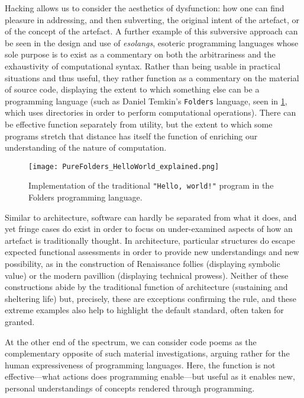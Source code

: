 Hacking allows us to consider the aesthetics of dysfunction: how one can find pleasure in addressing, and then subverting, the original intent of the artefact, or of the concept of the artefact. A further example of this subversive approach can be seen in the design and use of \emph{esolangs}, esoteric programming languages whose sole purpose is to exist as a commentary on both the arbitrariness and the exhaustivity of computational syntax. Rather than being usable in practical situations and thus useful, they rather function as a commentary on the material of source code, displaying the extent to which something else can be a programming language (such as Daniel Temkin's \lstinline{Folders} language, seen in \ref{graphic:folders}, which uses directories in order to perform computational operations). There can be effective function separately from utility, but the extent to which some programs stretch that distance has itself the function of enriching our understanding of the nature of computation.

\begin{figure}
  \texttt{[image: PureFolders\_HelloWorld\_explained.png]}
  \caption{Implementation of the traditional \lstinline{"Hello, world!"} program in the Folders programming language. \citep{temkin_daniel_2015}}
  \label{graphic:folders}
\end{figure}

Similar to architecture, software can hardly be separated from what it does, and yet fringe cases do exist in order to focus on under-examined aspects of how an artefact is traditionally thought. In architecture, particular structures do escape expected functional assessments in order to provide new understandings and new possibility, as in the construction of Renaissance follies (displaying symbolic value) or the modern pavillion (displaying technical prowess). Neither of these constructions abide by the traditional function of  architecture (sustaining and sheltering life) but, precisely, these are exceptions confirming the rule, and these extreme examples also help to highlight the default standard, often taken for granted.

At the other end of the spectrum, we can consider code poems as the complementary opposite of such material investigations, arguing rather for the human expressiveness of programming languages. Here, the function is not effective—what actions does programming enable—but useful as it enables new, personal understandings of concepts rendered through programming.

